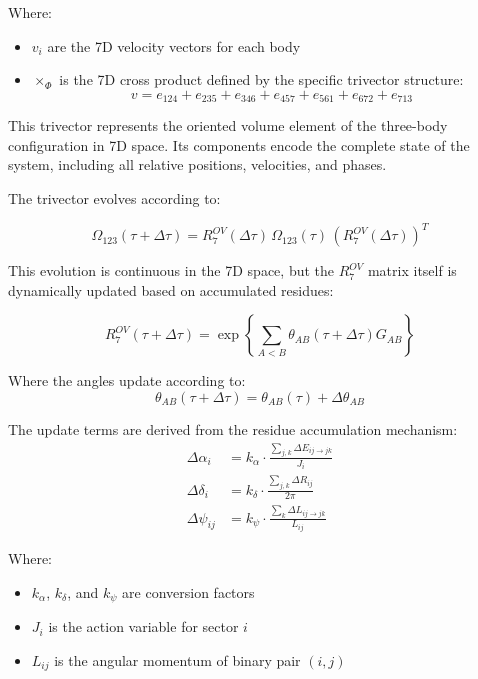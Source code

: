 \documentclass{article}
\begin{document}
Where:
\begin{itemize}
\item $v_i$ are the 7D velocity vectors for each body
\item $\times_\Phi$ is the 7D cross product defined by the specific trivector structure:
\begin{equation}
v = e_{124} + e_{235} + e_{346} + e_{457} + e_{561} + e_{672} + e_{713}
\end{equation}
\end{itemize}

This trivector represents the oriented volume element of the three-body configuration in 7D space. Its components encode the complete state of the system, including all relative positions, velocities, and phases.

The trivector evolves according to:

\begin{equation}
\Omega_{123}(\tau+\Delta\tau) = R^{OV}_7(\Delta\tau) \, \Omega_{123}(\tau) \, (R^{OV}_7(\Delta\tau))^T
\end{equation}

This evolution is continuous in the 7D space, but the $R^{OV}_7$ matrix itself is dynamically updated based on accumulated residues:

\begin{equation}
R^{OV}_7(\tau+\Delta\tau) = \exp\left\{\sum_{A<B} \theta_{AB}(\tau+\Delta\tau) G_{AB}\right\}
\end{equation}

Where the angles update according to:
\begin{equation}
\theta_{AB}(\tau+\Delta\tau) = \theta_{AB}(\tau) + \Delta\theta_{AB}
\end{equation}

The update terms are derived from the residue accumulation mechanism:
\begin{align}
\Delta\alpha_i &= k_\alpha \cdot \frac{\sum_{j,k} \Delta E_{ij \to jk}}{J_i} \\
\Delta\delta_i &= k_\delta \cdot \frac{\sum_{j,k} \Delta R_{ij}}{2\pi} \\
\Delta\psi_{ij} &= k_\psi \cdot \frac{\sum_{k} \Delta L_{ij \to jk}}{L_{ij}}
\end{align}

Where:
\begin{itemize}
\item $k_\alpha$, $k_\delta$, and $k_\psi$ are conversion factors
\item $J_i$ is the action variable for sector $i$
\item $L_{ij}$ is the angular momentum of binary pair $(i,j)$
\end{itemize}
\end{document}

